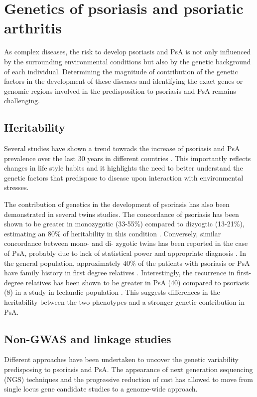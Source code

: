  

\section{Genetics of psoriasis and psoriatic arthritis}

As complex diseases, the risk to develop psoriasis and PsA is not only influenced by the surrounding environmental conditions but also by the genetic background of each individual. Determining the magnitude of contribution of the genetic factors in the development of these diseases and identifying the exact genes or genomic regions involved in the predisposition to psoriasis and PsA remains challenging.  


\subsection{Heritability}

Several studies have shown a trend towrads the increase of psoriasis and PsA prevalence over the last 30 years in different countries \parencite{Organization2016}. This importantly reflects changes in life style habits and it highlights the need to better understand the genetic factors that predispose to disease upon interaction with environmental stresses.

The contribution of genetics in the development of psoriasis has also been demonstrated in several twins studies. The concordance of psoriasis has been shown to be greater in monozygotic (33-55\%) compared to dizyogtic (13-21\%), estimating an 80\% of heritability in this condition \parencite{Faber1974, Duffy1993, Pendersen2008}. Conversely, similar concordance between mono- and di- zygotic twins has been reported in the case of PsA, probably due to lack of statistical power and appropriate diagnosis \parencite{Pendersen2008}. In the general population, approximately 40\% of the patients with psoriasis or PsA have family history in first degree relatives \parencite{Gladman1986}. Interestingly, the recurrence in first-degree relatives has been shown to be greater in PsA (40) compared to psoriasis (8) in a study in Icelandic population \parencite{Chandran2009}. This suggests differences in the heritability between the two phenotypes and a stronger genetic contribution in PsA.

\subsection{Non-GWAS and linkage studies}
Different approaches have been undertaken to uncover the genetic variability predisposing to psoriasis and PsA. The appearance of next generation sequencing (NGS) techniques and the progressive reduction of cost has allowed to move from single locus gene candidate studies to a genome-wide approach.


